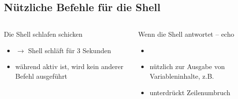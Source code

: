 \documentclass[aspectratio=43]{beamer}
\begin{document}
\subsection{Nützliche Befehle für die Shell}
\begin{frame}{}
  \begin{columns}
    \begin{column}{0.5\textwidth}
      \begin{block}{Die Shell schlafen schicken}
        \begin{itemize}
          \item {} $\rightarrow$ Shell schläft für 3 Sekunden
          \item während  aktiv ist, wird kein anderer Befehl ausgeführt
        \end{itemize}
      \end{block}
    \end{column}
    \begin{column}{0.5\textwidth}
       \begin{block}{Wenn die Shell antwortet -- echo}
            \begin{itemize}
              \item {}
              \item nützlich zur Ausgabe von Variableninhalte, z.B. 
              \item {} unterdrückt Zeilenumbruch
            \end{itemize}
        \end{block}
    \end{column}
  \end{columns}
\end{frame}
\end{document}
